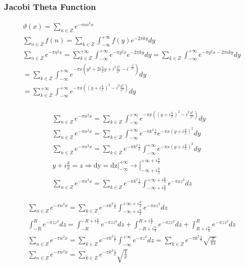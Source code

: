 	\subsubsection{Jacobi Theta Function}
	
	$$
	\begin{aligned}
		& \vartheta(x)=\sum_{n \in Z} e^{-m n^2 x} \\
		& \sum_{n \in Z} f(n)=\sum_{k \in Z} \int_{-\infty}^{+\infty} f(y) e^{-2 \pi k y} d y \\
		& \sum_{n \in Z} e^{-\pi \eta^2 x}=\sum_{k \in Z}^{+\infty} \int_{-\infty}^{+\infty} e^{-\pi y^2 x} e^{-2 \pi k y} d y=\sum_{k \in Z} \int_{-\infty}^{+\infty} e^{-\pi y^2 x-2 \pi i k y} d y \\
		& =\sum_{k \in Z} \int_{-\infty}^{+\infty} e^{-\pi x\left(y^2+2 i \frac{k}{x} y+i^2 \frac{k^2}{x^2}-i^{-\frac{k^2}{x^2}}\right)} d y \\
		& =\sum_{k \in Z}^{+\infty} \int_{-\infty}^{+\infty} e^{-\pi x\left(\left(y+i \frac{k}{x}\right)^2-i^2 \frac{k^2}{x^2}\right)} d y \\
		&
	\end{aligned}
	$$
	
	$$
	\begin{gathered}
		\sum_{n \in Z} e^{-\pi n^2 x}=\sum_{k \in Z} \int_{-\infty}^{+\infty} e^{-\pi x\left(\left(y+i \frac{k}{x}\right)^2-i^2 \frac{k^2}{x^2}\right)} d y \\
		\sum_{n \in Z} e^{-\pi n^2 x}=\sum_{k \in Z} \int_{-\infty}^{+\infty} e^{-\pi k^2 \frac{1}{x}} e^{-\pi x\left(y+i \frac{k}{x}\right)^2} d y \\
		\sum_{n \in Z} e^{-\pi n^2 x}=\sum_{k \in Z} e^{-\pi k^2 \frac{1}{x}} \int_{-\infty}^{+\infty} e^{-\pi x\left(y+i \frac{k}{x}\right)^2} d y \\
		y+i \frac{k}{x}=z \Rightarrow \mathrm{dy}=\left.\left.\mathrm{dz}\right|_{-\infty} ^{+\infty} \rightarrow\right|_{-\infty+i \frac{k}{x}} ^{+\infty+i \frac{k}{x}} \\
		\sum_{n \in Z} e^{-\pi n^2 x}=\sum_{k \in Z} e^{-\pi k^2 \frac{1}{x}} \int_{-\infty+i \frac{k}{x}}^{+\infty+i \frac{k}{x}} e^{-\pi x z^2} d z
	\end{gathered}
	$$
	
	$$
	\begin{aligned}
		& \sum_{n \in Z} e^{-\pi n^2 x}=\sum_{k \in Z} e^{-\pi k^2 \frac{1}{x}} \int_{-\infty+i \frac{k}{x}}^{+\infty+i \frac{k}{x}} e^{-\pi x z^2} d z \\
		& \int_{-R}^R e^{-\pi z z^2} d z=\int_{-R}^{-R+i \frac{k}{x}} e^{-\pi z z^2} d z+\int_{-R+i \frac{k}{x}}^{R+i \frac{k}{x}} e^{-\pi z z^2} d z+\int_{R+i \frac{k}{x}}^R e^{-\pi z z^2} d z \\
		& \sum_{n \in Z} e^{-\pi n^2 x}=\sum_{k \in Z} e^{-\pi k^2 \frac{1}{x}} \int_{-\infty}^{+\infty} e^{-\pi z^2} d z=\sum_{k \in Z} e^{-\pi k^2 \frac{1}{x}} \sqrt{\frac{\pi}{\pi x}} \\
		& \sum_{n \in Z} e^{-\pi n^2 x}=\sum_{k \in Z} e^{-\pi k^2 \frac{1}{x}} \sqrt{\frac{1}{x}} \\
		&
	\end{aligned}
	$$
	
